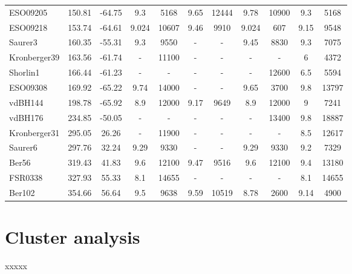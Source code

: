 \documentclass[draft]{aa}
\begin{document}
\begin{table*}
\begin{tabular}{lcccccccccc}
ESO09205     & 150.81 & -64.75    & 9.3   & 5168  & 9.65  & 12444 & 9.78  & 10900 & 9.3   & 5168  \\
ESO09218     & 153.74 & -64.61    & 9.024 & 10607 & 9.46  & 9910  & 9.024 & 607   & 9.15  & 9548  \\
Saurer3      & 160.35 & -55.31    & 9.3   & 9550  & -   & -   & 9.45  & 8830  & 9.3   & 7075  \\
Kronberger39 & 163.56 & -61.74    & -   & 11100 & -   & -   & -   & -   & 6     & 4372  \\
Shorlin1     & 166.44 & -61.23    & -   & -   & -   & -   & -   & 12600 & 6.5   & 5594  \\
ESO09308     & 169.92 & -65.22    & 9.74  & 14000 & -   & -   & 9.65  & 3700  & 9.8   & 13797 \\
vdBH144      & 198.78 & -65.92    & 8.9   & 12000 & 9.17  & 9649  & 8.9   & 12000 & 9     & 7241  \\
vdBH176      & 234.85 & -50.05    & -   & -   & -   & -   & -   & 13400 & 9.8   & 18887 \\
Kronberger31 & 295.05 & 26.26     & -   & 11900 & -   & -   & -   & -   & 8.5   & 12617 \\
Saurer6      & 297.76 & 32.24     & 9.29  & 9330  & -   & -   & 9.29  & 9330  & 9.2   & 7329  \\
Ber56        & 319.43 & 41.83     & 9.6   & 12100 & 9.47  & 9516  & 9.6   & 12100 & 9.4   & 13180 \\
FSR0338      & 327.93 & 55.33     & 8.1   & 14655 & -   & -   & -   & -   & 8.1   & 14655 \\
Ber102       & 354.66 & 56.64     & 9.5   & 9638  & 9.59  & 10519 & 8.78  & 2600  & 9.14  & 4900 \\
\hline                                   %
\end{tabular}
\end{table*}





\section{Cluster analysis}
 \label{sec:clust_analy}

 xxxxx





\end{document}
